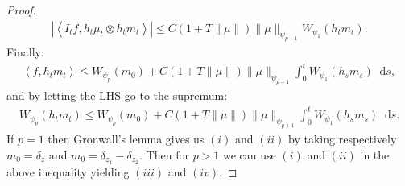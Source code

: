 \documentclass[11pt,a4paper]{article}
\newcommand{\brac}[1]{\left\langle#1\right\rangle}
\newcommand{\dd}{\mathop{}\!\mathrm{d}}
\begin{document}
\begin{proof}
\begin{align*}
        \left| \brac{I_tf,h_t\mu_t \otimes h_t m_t} \right| \leq C(1 + T\|\mu\|)\|\mu\|_{\psi_{p+1}} W_{\psi_1}(h_tm_t).
    \end{align*}
    Finally:
    \begin{align*}
        \brac{f,h_tm_t} \leq W_{\psi_p}(m_0) + C(1 + T\|\mu\|)\|\mu\|_{\psi_{p+1}}\int_0^t  W_{\psi_1}(h_sm_s)\dd s,
    \end{align*}
    and by letting the LHS go to the supremum:
    \begin{align*}
        W_{\psi_p}(h_tm_t) \leq W_{\psi_p}(m_0) + C(1 + T\|\mu\|)\|\mu\|_{\psi_{p+1}}\int_0^t  W_{\psi_1}(h_sm_s)\dd s.
    \end{align*}
    If $p = 1$ then Gronwall's lemma gives us $(i)$ and $(ii)$ by taking respectively $m_0 = \delta_z$ and $m_0 = \delta_{z_1} -\delta_{z_2}$. Then for $p > 1$ we can use $(i)$ and $(ii)$ in the above inequality yielding $(iii)$ and $(iv)$.
\end{proof}
\end{document}
